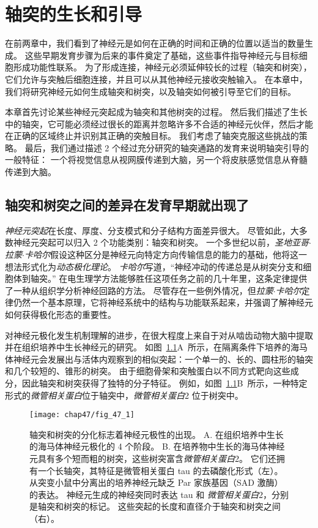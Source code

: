 \chapter{轴突的生长和引导} \label{chap:chap47}


在前两章中，我们看到了神经元是如何在正确的时间和正确的位置以适当的数量生成。
这些早期发育步骤为后来的事件奠定了基础，这些事件指导神经元与目标细胞形成功能性联系。
为了形成连接，神经元必须延伸较长的过程（轴突和树突），它们允许与突触后细胞连接，并且可以从其他神经元接收突触输入。
在本章中，我们将研究神经元如何生成轴突和树突，以及轴突如何被引导至它们的目标。


本章首先讨论某些神经元突起成为轴突和其他树突的过程。
然后我们描述了生长中的轴突，它可能必须经过很长的距离并忽略许多不合适的神经元伙伴，然后才能在正确的区域终止并识别其正确的突触目标。
我们考虑了轴突克服这些挑战的策略。
最后，我们通过描述 2 个经过充分研究的轴突通路的发育来说明轴突引导的一般特征：
一个将视觉信息从视网膜传递到大脑，另一个将皮肤感觉信息从脊髓传递到大脑。



\section{轴突和树突之间的差异在发育早期就出现了}

\textit{神经元突起}在长度、厚度、分支模式和分子结构方面差异很大。
尽管如此，大多数神经元突起可以归入 2 个功能类别：轴突和树突。
一个多世纪以前，\textit{圣地亚哥$\cdot$拉蒙$\cdot$卡哈尔}假设这种区分是神经元向特定方向传输信息的能力的基础，他将这一想法形式化为\textit{动态极化理论}。
\textit{卡哈尔}写道，“神经冲动的传递总是从树突分支和细胞体到轴突。” 
在电生理学方法能够胜任这项任务之前的几十年里，这条定律提供了一种从组织学分析神经回路的方法。
尽管存在一些例外情况，但\textit{拉蒙$\cdot$卡哈尔}定律仍然一个基本原理，它将神经系统中的结构与功能联系起来，并强调了解神经元如何获得极化形态的重要性。


对神经元极化发生机制理解的进步，在很大程度上来自于对从啮齿动物大脑中提取并在组织培养中生长神经元的研究。
如图~\ref{fig:47_1}A~所示，在隔离条件下培养的海马体神经元会发展出与活体内观察到的相似突起：一个单一的、长的、圆柱形的轴突和几个较短的、锥形的树突。
由于细胞骨架和突触蛋白以不同方式靶向这些成分，因此轴突和树突获得了独特的分子特征。
例如，如图~\ref{fig:47_1}B~所示，一种特定形式的\textit{微管相关蛋白}位于轴突中，\textit{微管相关蛋白}2 位于树突中。


\begin{figure}[htbp]
	\centering
	\texttt{[image: chap47/fig\_47\_1]}
	\caption{轴突和树突的分化标志着神经元极性的出现。
		A. 在组织培养中生长的海马体神经元极化的 4 个阶段\cite{kaech2006culturing}。
		B. 在培养物中生长的海马体神经元具有多个短而粗的树突，这些树突富含\textit{微管相关蛋白}2。
		它们还拥有一个长轴突，其特征是微管相关蛋白 tau 的去磷酸化形式（左）。
		从突变小鼠中分离出的培养神经元缺乏 Par 家族基因（SAD 激酶）的表达。
		神经元生成的神经突同时表达 tau 和 \textit{微管相关蛋白}2，分别是轴突和树突的标记。
		这些突起的长度和直径介于轴突和树突之间（右）\cite{kishi2005mammalian}。}
	\label{fig:47_1}
\end{figure}


